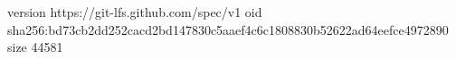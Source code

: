 version https://git-lfs.github.com/spec/v1
oid sha256:bd73cb2dd252cacd2bd147830c5aaef4c6c1808830b52622ad64eefce4972890
size 44581
